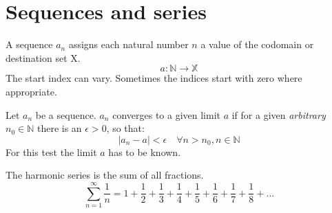 \chapter{Sequences and series}

\begin{definition}[Sequence]
    A sequence $a_n$ assigns each natural number $n$ a value of the codomain or destination set X.
    \begin{equation}
        a:\mathbb{N} \rightarrow \mathbb{X}
    \end{equation}
    The start index can vary. Sometimes the indices start with zero where appropriate.
\end{definition}

\begin{definition}
    Let $a_n$ be a sequence. 
    $a_n$ converges to a given limit $a$ if for a given \emph{arbitrary} $n_0 \in \mathbb{N}$ 
    there is an $\epsilon>0$, so that:
    \begin{equation}
        |a_n - a| < \epsilon \quad \forall n > n_0, n \in \mathbb{N}
    \end{equation}
    For this test the limit $a$ has to be known.
\end{definition}

\begin{definition}
    The harmonic series is the sum of all fractions.
    \begin{equation}
        \sum_{n=1}^{\infty}\frac{1}{n} = 
            1 + 
            \frac{1}{2} + 
            \frac{1}{3} + \frac{1}{4} + 
            \frac{1}{5} + \frac{1}{6} + \frac{1}{7} + \frac{1}{8} + ...
    \end{equation}
\end{definition}


